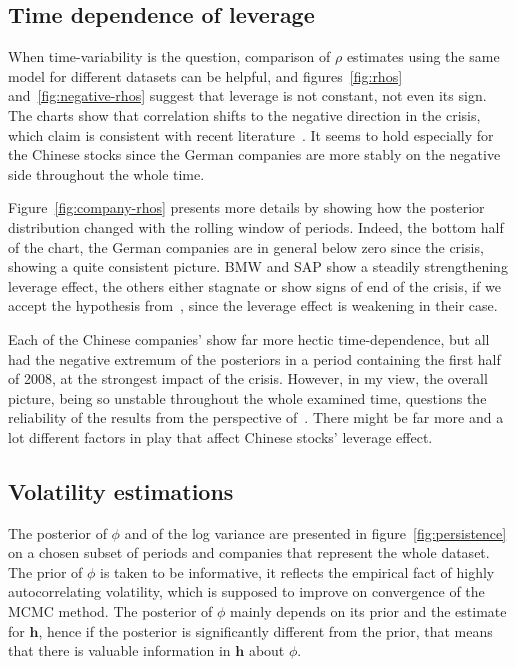 \subsection{Time dependence of leverage}

When time-variability is the question, comparison of $\rho$ estimates using the same model for different datasets can be helpful, and figures~\ref{fig:rhos} and~\ref{fig:negative-rhos} suggest that leverage is not constant, not even its sign.
The charts show that correlation shifts to the negative direction in the crisis, which claim is consistent with recent literature~\citep{Christensen2015}.
It seems to hold especially for the Chinese stocks since the German companies are more stably on the negative side throughout the whole time.

Figure~\ref{fig:company-rhos} presents more details by showing how the posterior distribution changed with the rolling window of periods.
Indeed, the bottom half of the chart, the German companies are in general below zero since the crisis, showing a quite consistent picture.
BMW and SAP show a steadily strengthening leverage effect, the others either stagnate or show signs of end of the crisis, if we accept the hypothesis from~\citeauthor{Christensen2015}, since the leverage effect is weakening in their case.

Each of the Chinese companies' show far more hectic time-dependence, but all had the negative extremum of the posteriors in a period containing the first half of 2008, at the strongest impact of the crisis.
However, in my view, the overall picture, being so unstable throughout the whole examined time, questions the reliability of the results from the perspective of~\citeauthor{Christensen2015}.
There might be far more and a lot different factors in play that affect Chinese stocks' leverage effect.

\subsection{Volatility estimations}

The posterior of $\phi$ and of the log variance are presented in figure~\ref{fig:persistence} on a chosen subset of periods and companies that represent the whole dataset.
The prior of $\phi$ is taken to be informative, it reflects the empirical fact of highly autocorrelating volatility, which is supposed to improve on convergence of the MCMC method.
The posterior of $\phi$ mainly depends on its prior and the estimate for $\bm h$, hence if the posterior is significantly different from the prior, that means that there is valuable information in $\bm h$ about $\phi$.

